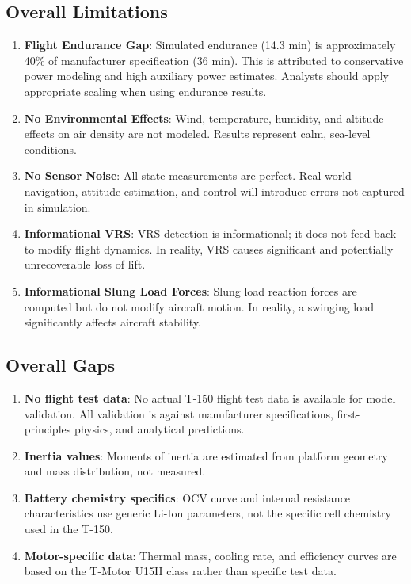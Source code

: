 \subsection{\unclass Overall Limitations}\label{sec:OverallLimitations}

\begin{enumerate}
	\item \unclass \textbf{Flight Endurance Gap}: Simulated endurance (14.3 min) is approximately 40\% of manufacturer specification (36 min). This is attributed to conservative power modeling and high auxiliary power estimates. Analysts should apply appropriate scaling when using endurance results.

	\item \unclass \textbf{No Environmental Effects}: Wind, temperature, humidity, and altitude effects on air density are not modeled. Results represent calm, sea-level conditions.

	\item \unclass \textbf{No Sensor Noise}: All state measurements are perfect. Real-world navigation, attitude estimation, and control will introduce errors not captured in simulation.

	\item \unclass \textbf{Informational VRS}: VRS detection is informational; it does not feed back to modify flight dynamics. In reality, VRS causes significant and potentially unrecoverable loss of lift.

	\item \unclass \textbf{Informational Slung Load Forces}: Slung load reaction forces are computed but do not modify aircraft motion. In reality, a swinging load significantly affects aircraft stability.
\end{enumerate}

\subsection{\unclass Overall Gaps}\label{sec:OverallGaps}

\begin{enumerate}
	\item \unclass \textbf{No flight test data}: No actual T-150 flight test data is available for model validation. All validation is against manufacturer specifications, first-principles physics, and analytical predictions.

	\item \unclass \textbf{Inertia values}: Moments of inertia are estimated from platform geometry and mass distribution, not measured.

	\item \unclass \textbf{Battery chemistry specifics}: OCV curve and internal resistance characteristics use generic Li-Ion parameters, not the specific cell chemistry used in the T-150.

	\item \unclass \textbf{Motor-specific data}: Thermal mass, cooling rate, and efficiency curves are based on the T-Motor U15II class rather than specific test data.
\end{enumerate}

